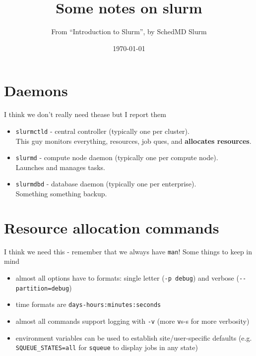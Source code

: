 \documentclass{article}
\title{\textbf{Some notes on slurm}}
\author{From ``Introduction to Slurm'', by SchedMD Slurm}
\date{\today}
\begin{document}
\maketitle

\section{Daemons}
I think we don't really need thease but I report them
\begin{itemize}
	\item \verb|slurmctld| - central controller (typically one per
		cluster).\\[3pt]This guy monitors everything, resources, job ques,
		and \textbf{allocates resources}.
	\item \verb|slurmd| - compute node daemon (typically one per compute
		node).\\[3pt]Launches and manages tasks.
	\item \verb|slurmdbd| - database daemon (typically one per
		enterprise).\\[3pt] Something something backup.
\end{itemize}

\section{Resource allocation commands}
I think we need this - remember that we always have \verb|man|!
Some things to keep in mind
\begin{itemize}
	\item almost all options have to formats: single letter (\verb|-p debug|)
		and verbose (\verb|--partition=debug|)
	\item time formats are \verb|days-hours:minutes:seconds|
	\item almost all commands support logging with \verb|-v| (more
		\verb|v|s-s for more verbosity)
	\item environment variables can be used to establish site/user-specific
		defaults (e.g. \verb|SQUEUE_STATES=all| for \verb|squeue| to display
		jobs in any state)
\end{itemize}
\end{document}
